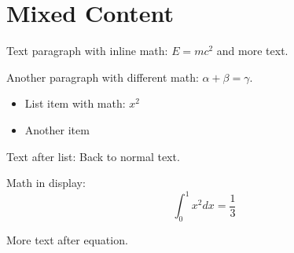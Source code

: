 \documentclass{article}
\begin{document}
\section{Mixed Content}

Text paragraph with inline math: $E = mc^2$ and more text.

Another paragraph with different math: $\alpha + \beta = \gamma$.

\begin{itemize}
\item List item with math: $x^2$
\item Another item
\end{itemize}

Text after list: Back to normal text.

Math in display:
\begin{equation}
\int_0^1 x^2 dx = \frac{1}{3}
\end{equation}

More text after equation.
\end{document}
